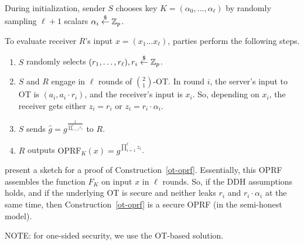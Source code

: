 \begin{construction}
\label{ot-oprf}
  During initialization, sender $S$ chooses key
  $K=(\alpha_0,\ldots,\alpha_\ell)$ by randomly sampling $\ell+1$
  scalars $\alpha_i\stackrel{\$}{\leftarrow}\mathbb{Z}_p$.

  To evaluate receiver $R$'s input $x=(x_1\ldots{}x_\ell)$, parties perform the following steps.
  \begin{enumerate}
  \item $S$ randomly selects $(r_1,\ldots,r_\ell),r_i\stackrel{\$}{\leftarrow}\mathbb{Z}_p$.
  \item $S$ and $R$ engage in $\ell$ rounds of $\binom{2}{1}$-OT. In round
    $i$, the server's input to OT is $(a_i,a_i\cdot{}r_i)$, and the
    receiver's input is $x_i$. So, depending on $x_i$, the receiver gets either $z_i=r_i$ or $z_i=r_i\cdot{}\alpha_i$.
  \item $S$ sends $\hat{g}=g^{\frac{1}{\prod_{i=1}^{\ell}r_i}}$ to $R$.
    \item $R$ outputs $\text{OPRF}_K(x)=\hat{g}^{\prod^{\ell}_{i=1}z_i}$.
    
    \end{enumerate}
\end{construction}

\citet{oprf} present a sketch for a proof of
Construction~\ref{ot-oprf}. Essentially, this OPRF assembles the
\citeauthor{prf} function $F_K$ on input $x$ in $\ell$ rounds.  So, if
the DDH assumptions holds, and if the underlying OT is secure and
neither leaks $r_i$ and $r_i\cdot\alpha_i$ at the same time, then
Construction~\ref{ot-oprf} is a secure OPRF (in the semi-honest
model).

NOTE: for one-sided security, we use the OT-based solution.

